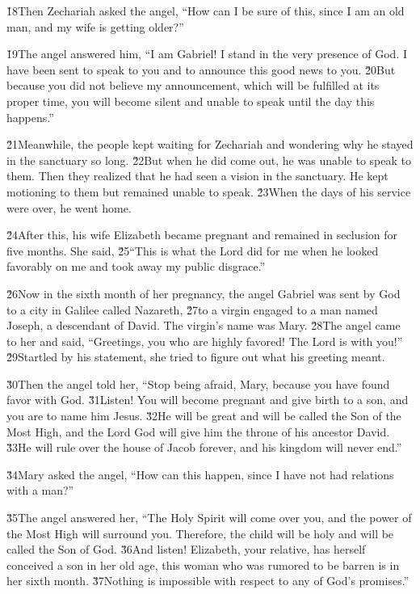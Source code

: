 \v{18}Then Zechariah asked the angel, ``How can I be sure of this, since I am an old man, and my wife is getting older?''

\v{19}The angel answered him, ``I am Gabriel! I stand in the very presence of God. I have been sent to speak to you and to announce this good news to you. \v{20}But because you did not believe my announcement, which will be fulfilled at its proper time, you will become silent and unable to speak until the day this happens.''

\v{21}Meanwhile, the people kept waiting for Zechariah and wondering why he stayed in the sanctuary so long. \v{22}But when he did come out, he was unable to speak to them. Then they realized that he had seen a vision in the sanctuary. He kept motioning to them but remained unable to speak. \v{23}When the days of his service were over, he went home.

\v{24}After this, his wife Elizabeth became pregnant and remained in seclusion for five months. She said, \v{25}``This is what the Lord did for me when he looked favorably on me and took away my public disgrace.''

\v{26}Now in the sixth month of her pregnancy, the angel Gabriel was sent by God to a city in Galilee called Nazareth, \v{27}to a virgin engaged to a man named Joseph, a descendant of David. The virgin's name was Mary. \v{28}The angel came to her and said, ``Greetings, you who are highly favored! The Lord is with you!'' \v{29}Startled by his statement, she tried to figure out what his greeting meant.

\v{30}Then the angel told her, ``Stop being afraid, Mary, because you have found favor with God. \v{31}Listen! You will become pregnant and give birth to a son, and you are to name him Jesus. \v{32}He will be great and will be called the Son of the Most High, and the Lord God will give him the throne of his ancestor David. \v{33}He will rule over the house of Jacob forever, and his kingdom will never end.''

\v{34}Mary asked the angel, ``How can this happen, since I have not had relations with a man?''

\v{35}The angel answered her, ``The Holy Spirit will come over you, and the power of the Most High will surround you. Therefore, the child will be holy and will be called the Son of God. \v{36}And listen! Elizabeth, your relative, has herself conceived a son in her old age, this woman who was rumored to be barren is in her sixth month. \v{37}Nothing is impossible with respect to any of God's promises.''

